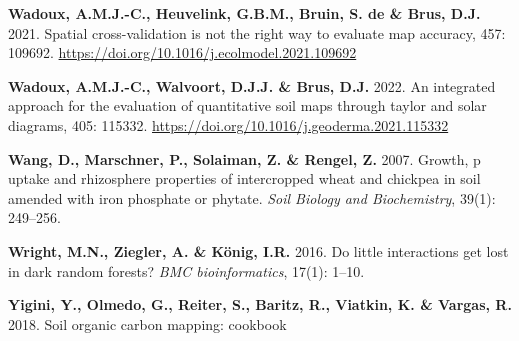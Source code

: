 \documentclass[
  10pt,
  b5paper,
  oneside]{book}
\newlength{\cslhangindent}
\newlength{\cslentryspacingunit} %
\newenvironment{CSLReferences}[2] %
 {%
  \setlength{\parindent}{0pt}
  \ifodd #1
  \let\oldpar\par
  \def\par{\hangindent=\cslhangindent\oldpar}
  \fi
  \setlength{\parskip}{#2\cslentryspacingunit}
 }%
 {}
\begin{document}
\begin{CSLReferences}{0}{0}
\leavevmode{}%
\textbf{Wadoux, A.M.J.-C., Heuvelink, G.B.M., Bruin, S. de \& Brus, D.J.} 2021. Spatial cross-validation is not the right way to evaluate map accuracy, 457: 109692. \url{https://doi.org/10.1016/j.ecolmodel.2021.109692}

\leavevmode{}%
\textbf{Wadoux, A.M.J.-C., Walvoort, D.J.J. \& Brus, D.J.} 2022. An integrated approach for the evaluation of quantitative soil maps through taylor and solar diagrams, 405: 115332. \url{https://doi.org/10.1016/j.geoderma.2021.115332}

\leavevmode{}%
\textbf{Wang, D., Marschner, P., Solaiman, Z. \& Rengel, Z.} 2007. Growth, p uptake and rhizosphere properties of intercropped wheat and chickpea in soil amended with iron phosphate or phytate. \emph{Soil Biology and Biochemistry}, 39(1): 249--256.

\leavevmode{}%
\textbf{Wright, M.N., Ziegler, A. \& König, I.R.} 2016. Do little interactions get lost in dark random forests? \emph{BMC bioinformatics}, 17(1): 1--10.

\leavevmode{}%
\textbf{Yigini, Y., Olmedo, G., Reiter, S., Baritz, R., Viatkin, K. \& Vargas, R.} 2018. Soil organic carbon mapping: cookbook

\end{CSLReferences}


\end{document}
